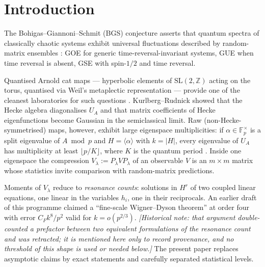 \documentclass[11pt]{article}
\begin{document}
\tableofcontents

\section{Introduction}\label{sec:intro}

The Bohigas--Giannoni--Schmit (BGS) conjecture asserts that quantum
spectra of classically chaotic systems exhibit universal fluctuations
described by random-matrix ensembles \cite{BGS84}: GOE for generic
time-reversal-invariant systems, GUE when time reversal is absent,
GSE with spin-$1/2$ and time reversal.

Quantised Arnold cat maps --- hyperbolic elements of
$\mathrm{SL}(2,\mathbb Z)$ acting on the torus, quantised via Weil's
metaplectic representation --- provide one of the cleanest laboratories
for such questions \cite{HB80}. Kurlberg--Rudnick
\cite{KR00,KR01} showed that the Hecke algebra diagonalises $U_A$ and
that matrix coefficients of Hecke eigenfunctions become Gaussian in
the semiclassical limit. Raw (non-Hecke-symmetrised) maps, however,
exhibit large eigenspace multiplicities: if $\alpha\in\mathbb F_p^\times$
is a split eigenvalue of $A\bmod p$ and $H=\langle\alpha\rangle$
with $k=|H|$, every eigenvalue of $U_A$ has multiplicity at least
$\lfloor p/K\rfloor$, where $K$ is the quantum period
\cite{KR00}. Inside one eigenspace the compression
$V_\lambda:=P_\lambda V P_\lambda$ of an observable $V$ is an
$m\times m$ matrix whose statistics invite comparison with
random-matrix predictions.

Moments of $V_\lambda$ reduce to \emph{resonance counts}: solutions in
$H^r$ of two coupled linear equations, one linear in the variables
$h_i$, one in their reciprocals. An earlier draft of this programme
claimed a ``fine-scale Wigner--Dyson theorem'' at order four with error
$C_Fk^8/p^2$ valid for $k=o(p^{2/3})$. \emph{[Historical note: that
argument double-counted a prefactor between two equivalent
formulations of the resonance count and was retracted; it is mentioned
here only to record provenance, and no threshold of this shape is used
or needed below.]} The present paper replaces asymptotic claims by
exact statements and carefully separated statistical levels.
\end{document}

